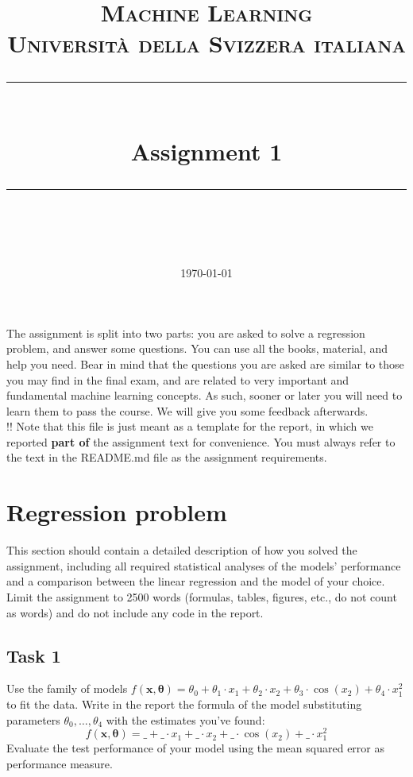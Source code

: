 \documentclass[11pt]{scrartcl}
\title{	
	\normalfont\normalsize
	\textsc{Machine Learning\\%
	Universit\`a della Svizzera italiana}\\
	\vspace{25pt}
	\rule{\linewidth}{0.5pt}\\
	\vspace{20pt}
	{\huge Assignment 1}\\
	\vspace{12pt}
	\rule{\linewidth}{1pt}\\
	\vspace{12pt}
}
\author{\LARGE \thestudent}
\date{\normalsize\today}
\begin{document}
\maketitle

The assignment is split into two parts: you are asked to solve a regression problem, and answer some questions. 
You can use all the books, material, and help you need. 
Bear in mind that the questions you are asked are similar to those you may find in the final exam, and are related to very important and fundamental machine learning concepts. 
As such, sooner or later you will need to learn them to pass the course. 
We will give you some feedback afterwards.\\

\noindent !! Note that this file is just meant as a template for the report, in which we reported \textbf{part of} the assignment text for convenience. You must always refer to the text in the README.md file as the assignment requirements.


\section{Regression problem}

This section should contain a detailed description of how you solved the assignment, including all required statistical analyses of the models' performance and a comparison between the linear regression and the model of your choice. Limit the assignment to 2500 words (formulas, tables, figures, etc., do not count as words) and do not include any code in the report.

\subsection{Task 1}
Use the family of models $f(\mathbf{x}, \boldsymbol{\theta}) = \theta_0 + \theta_1 \cdot x_1 + \theta_2 \cdot x_2 + \theta_3 \cdot \cos(x_2) + \theta_4 \cdot x_1^{2}$ to fit the data. Write in the report the formula of the model substituting parameters $\theta_0, \ldots, \theta_4$ with the estimates you've found:
$$f(\mathbf{x}, \boldsymbol{\theta}) = \_ + \_ \cdot x_1 + \_ \cdot x_2 + \_ \cdot \cos(x_2) + \_ \cdot x_1^{2}$$
Evaluate the test performance of your model using the mean squared error as performance measure.
\end{document}
